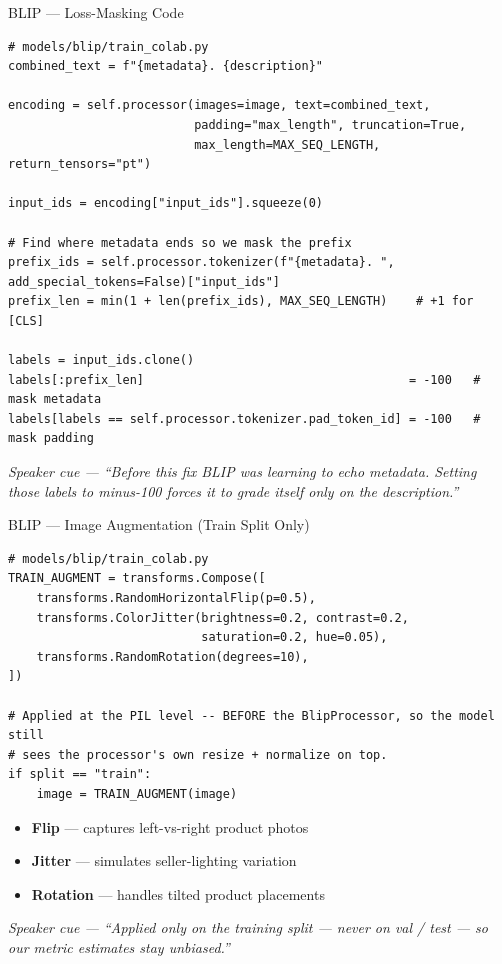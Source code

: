 \documentclass[10pt, aspectratio=169]{beamer}
\newcommand{\speakercue}[1]{%
  \vfill
  {\footnotesize\itshape\color{gray}Speaker cue --- #1}%
}
\begin{document}
\begin{frame}[fragile]{BLIP --- Loss-Masking Code}
  \begin{lstlisting}
# models/blip/train_colab.py
combined_text = f"{metadata}. {description}"

encoding = self.processor(images=image, text=combined_text,
                          padding="max_length", truncation=True,
                          max_length=MAX_SEQ_LENGTH, return_tensors="pt")

input_ids = encoding["input_ids"].squeeze(0)

# Find where metadata ends so we mask the prefix
prefix_ids = self.processor.tokenizer(f"{metadata}. ", add_special_tokens=False)["input_ids"]
prefix_len = min(1 + len(prefix_ids), MAX_SEQ_LENGTH)    # +1 for [CLS]

labels = input_ids.clone()
labels[:prefix_len]                                     = -100   # mask metadata
labels[labels == self.processor.tokenizer.pad_token_id] = -100   # mask padding
  \end{lstlisting}
  \speakercue{``Before this fix BLIP was learning to echo metadata. Setting
  those labels to minus-100 forces it to grade itself only on the description.''}
\end{frame}

\begin{frame}[fragile]{BLIP --- Image Augmentation (Train Split Only)}
  \begin{lstlisting}
# models/blip/train_colab.py
TRAIN_AUGMENT = transforms.Compose([
    transforms.RandomHorizontalFlip(p=0.5),
    transforms.ColorJitter(brightness=0.2, contrast=0.2,
                           saturation=0.2, hue=0.05),
    transforms.RandomRotation(degrees=10),
])

# Applied at the PIL level -- BEFORE the BlipProcessor, so the model still
# sees the processor's own resize + normalize on top.
if split == "train":
    image = TRAIN_AUGMENT(image)
  \end{lstlisting}
  \begin{itemize}\itemsep2pt
    \item \textbf{Flip} --- captures left-vs-right product photos
    \item \textbf{Jitter} --- simulates seller-lighting variation
    \item \textbf{Rotation} --- handles tilted product placements
  \end{itemize}
  \speakercue{``Applied only on the training split --- never on val / test ---
  so our metric estimates stay unbiased.''}
\end{frame}
\end{document}
